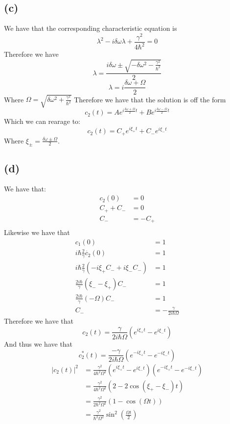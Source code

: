 \documentclass[11pt]{article}
\begin{document}
\subsection*{(c)}
We have that the corresponding characteristic equation is
$$\lambda^2-i\delta\omega\lambda+\frac{\gamma^2}{4\hbar^2}=0$$
Therefore we have 
$$\lambda = \frac{i\delta\omega\pm\sqrt{-\delta\omega^2-\frac{\gamma^2}{\hbar^2}}}{2}$$
$$\lambda = i\frac{\delta\omega+\Omega}{2}$$
Where $\Omega = \sqrt{\delta\omega^2+\frac{\gamma^2}{\hbar^2}}$
Therefore we have that the solution is off the form 
$$c_2(t) = Ae^{i\frac{\delta\omega+\Omega}{2}t}+Be^{i\frac{\delta\omega-\Omega}{2}t}$$
Which we can rearage to:
$$c_2(t) = C_{+}e^{i\xi_+ t}+C_{-}e^{i\xi_- t}$$
Where $\xi_{\pm} = \frac{\delta\omega\pm\Omega}{2}$.
\subsection*{(d)}
We have that:
\begin{align*}
    c_2(0) &= 0\\
    C_{+}+C_{-} &= 0\\
    C_{-} &= -C_{+}\\
\end{align*}
Likewise we have that 
\begin{align*}
    c_1(0)  &= 1\\
    i\hbar\frac{2}{\gamma}\dot{c_2}(0) &= 1\\
    i\hbar\frac{2}{\gamma}\left(-i\xi_{+}C_{-}+i\xi_{-}C_{-}\right) &= 1\\
    \frac{2i\hbar}{\gamma}\left(\xi_{-}-\xi_{+}\right)C_{-} &= 1\\
    \frac{2i\hbar}{\gamma}\left(-\Omega\right)C_{-} &= 1\\
    C_{-} &= -\frac{\gamma}{2i\hbar\Omega}
\end{align*}
Therefore we have that
$$c_{2}(t) = \frac{\gamma}{2i\hbar\Omega}\left(e^{i\xi_{+}t}-e^{i\xi_{-}t}\right)$$
And thus we have that 
$$c_{2}^{*}(t) = \frac{-\gamma}{2i\hbar\Omega}\left(e^{-i\xi_{+}t}-e^{-i\xi_{-}t}\right)$$
\begin{align*}
    |c_{2}(t)|^2 &= \frac{\gamma^2}{4\hbar^2\Omega^2}\left(e^{i\xi_{+}t}-e^{i\xi_{-}t}\right)\left(e^{-i\xi_{+}t}-e^{-i\xi_{-}t}\right)\\
    &= \frac{\gamma^2}{4\hbar^2\Omega^2}\left(2-2\cos\left(\xi_{+}-\xi_{-}\right)t\right)\\
    &= \frac{\gamma^2}{2\hbar^2\Omega^2}\left(1-\cos\left(\Omega t\right)\right)\\
    &= \frac{\gamma^2}{\hbar^2\Omega^2}\sin^2\left(\frac{\Omega t}{2}\right)\\
\end{align*}
\end{document}
